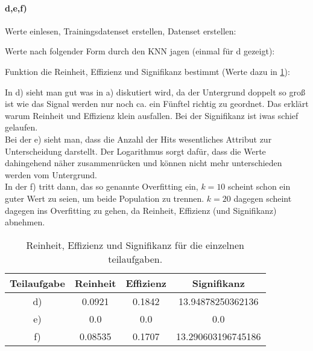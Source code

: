 \paragraph{d,e,f)}
Werte einlesen, Trainingsdatenset erstellen, Datenset erstellen:
 	
Werte nach folgender Form durch den KNN jagen (einmal für d gezeigt):

Funktion die Reinheit, Effizienz und Signifikanz bestimmt (Werte dazu in \ref{tab:tab}):

In d) sieht man gut was in a) diskutiert wird, da der Untergrund doppelt so groß ist wie das 
Signal werden nur noch ca. ein Fünftel richtig zu geordnet. 
Das erklärt warum Reinheit und Effizienz klein ausfallen. 
Bei der Signifikanz ist iwas schief gelaufen. \\
Bei der e) sieht man, dass die Anzahl der Hits wesentliches Attribut zur Unterscheidung darstellt. 
Der Logarithmus sorgt dafür, dass die Werte dahingehend näher zusammenrücken und können nicht mehr 
unterschieden werden vom Untergrund. \\
In der f) tritt dann, das so genannte Overfitting ein, $k = 10$ scheint schon ein guter  
Wert zu seien, um beide Population zu trennen. $k = 20$ dagegen scheint dagegen ins Overfitting 
zu gehen, da Reinheit, Effizienz (und Signifikanz) abnehmen. 
\begin{table}
 \centering
 \begin{tabular}{c|ccc}
   \toprule
	Teilaufgabe & Reinheit & Effizienz & Signifikanz \\
   \midrule
	d)&0.0921& 0.1842& 13.94878250362136\\
	e)&0.0& 0.0& 0.0\\
	f)&0.08535& 0.1707& 13.290603196745186\\
   \bottomrule
 \end{tabular}
 \caption{Reinheit, Effizienz und Signifikanz für die einzelnen teilaufgaben.}
 \label{tab:tab}
\end{table}
                              
